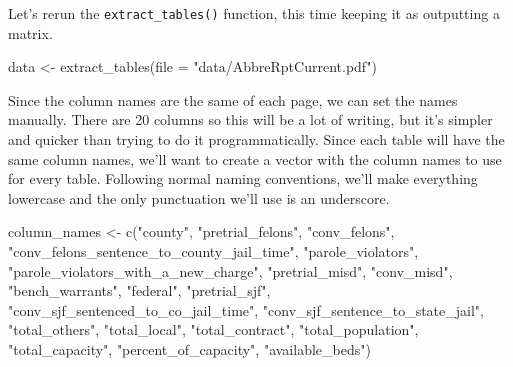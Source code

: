 \documentclass[
]{krantz}
\makeatletter
\newenvironment{Shaded}{\begin{snugshade}}{\end{snugshade}}
\newcommand{\AttributeTok}[1]{\textcolor[rgb]{0.61,0.61,0.61}{#1}}
\newcommand{\FunctionTok}[1]{\textcolor[rgb]{0,0,0}{#1}}
\newcommand{\NormalTok}[1]{#1}
\newcommand{\OtherTok}[1]{\textcolor[rgb]{0.37,0.37,0.37}{#1}}
\newcommand{\StringTok}[1]{\textcolor[rgb]{0.5,0.5,0.5}{#1}}
\newenvironment{kframe}{%
\medskip{}
\setlength{\fboxsep}{.8em}
 \def\at@end@of@kframe{}%
 \ifinner\ifhmode%
  \def\at@end@of@kframe{\end{minipage}}%
  \begin{minipage}{\columnwidth}%
 \fi\fi%
 \def\FrameCommand##1{\hskip\@totalleftmargin \hskip-\fboxsep
 \colorbox{shadecolor}{##1}\hskip-\fboxsep
     \hskip-\linewidth \hskip-\@totalleftmargin \hskip\columnwidth}%
 \MakeFramed {\advance\hsize-\width
   \@totalleftmargin\z@ \linewidth\hsize
   \@setminipage}}%
 {\par\unskip\endMakeFramed%
 \at@end@of@kframe}
\renewenvironment{Shaded}{\begin{kframe}}{\end{kframe}}
\makeatother
\begin{document}
Let's rerun the \texttt{extract\_tables()} function, this time keeping it as outputting a matrix.

\begin{Shaded}
\begin{Highlighting}[]
\NormalTok{data }\OtherTok{\textless{}{-}} \FunctionTok{extract\_tables}\NormalTok{(}\AttributeTok{file =} \StringTok{"data/AbbreRptCurrent.pdf"}\NormalTok{)}
\end{Highlighting}
\end{Shaded}

Since the column names are the same of each page, we can set the names manually. There are 20 columns so this will be a lot of writing, but it's simpler and quicker than trying to do it programmatically. Since each table will have the same column names, we'll want to create a vector with the column names to use for every table. Following normal naming conventions, we'll make everything lowercase and the only punctuation we'll use is an underscore.

\begin{Shaded}
\begin{Highlighting}[]
\NormalTok{column\_names }\OtherTok{\textless{}{-}} \FunctionTok{c}\NormalTok{(}\StringTok{"county"}\NormalTok{,}
                  \StringTok{"pretrial\_felons"}\NormalTok{,}
                  \StringTok{"conv\_felons"}\NormalTok{,}
                  \StringTok{"conv\_felons\_sentence\_to\_county\_jail\_time"}\NormalTok{,}
                  \StringTok{"parole\_violators"}\NormalTok{,}
                  \StringTok{"parole\_violators\_with\_a\_new\_charge"}\NormalTok{,}
                  \StringTok{"pretrial\_misd"}\NormalTok{,}
                  \StringTok{"conv\_misd"}\NormalTok{,}
                  \StringTok{"bench\_warrants"}\NormalTok{,}
                  \StringTok{"federal"}\NormalTok{,}
                  \StringTok{"pretrial\_sjf"}\NormalTok{,}
                  \StringTok{"conv\_sjf\_sentenced\_to\_co\_jail\_time"}\NormalTok{,}
                  \StringTok{"conv\_sjf\_sentence\_to\_state\_jail"}\NormalTok{,}
                  \StringTok{"total\_others"}\NormalTok{,}
                  \StringTok{"total\_local"}\NormalTok{,}
                  \StringTok{"total\_contract"}\NormalTok{,}
                  \StringTok{"total\_population"}\NormalTok{,}
                  \StringTok{"total\_capacity"}\NormalTok{,}
                  \StringTok{"percent\_of\_capacity"}\NormalTok{,}
                  \StringTok{"available\_beds"}\NormalTok{)}
\end{Highlighting}
\end{Shaded}
\end{document}
